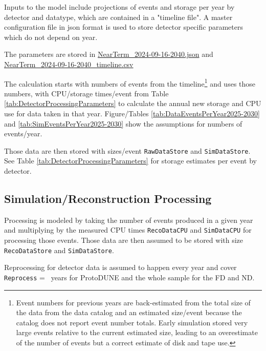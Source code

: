 \documentclass[12pt]{article}
\begin{document}
 Inputs to the model include projections of events and storage per year by detector and datatype, which are contained in a "timeline file".  A master configuration file in json format is used to store detector specific parameters which do not depend on year. 
 
 The parameters are stored in \href{https://github.com/DUNE/CCB-data/blob/CCB-Jun24/model-2024/NearTerm_2025-12-10-2040.json}{NearTerm\_2024-09-16-2040.json} and  \href{https://github.com/DUNE/CCB-data/blob/CCB-Jun24/model-2024/NearTerm_2025-12-10-2040_timeline.csv}{NearTerm\_2024-09-16-2040\_timeline.csv}
 
The calculation starts with numbers of events from the timeline\footnote{Event numbers for previous years are back-estimated from the total size of the data from the data catalog and an estimated size/event because the catalog does not report event number totals.  Early simulation stored very large events relative to the current estimated size, leading to an overestimate of the number of events but a correct estimate of disk and tape use.}  and uses those numbers, with CPU/storage times/event from Table \ref{tab:DetectorProcessingParameters} to calculate the annual new storage and CPU use for data taken in that year.  Figure/Tables \ref{tab:DataEventsPerYear2025-2030} and \ref{tab:SimEventsPerYear2025-2030} show the assumptions for numbers of events/year. 

{
}

{
}

Those data are then stored with sizes/event {\tt RawDataStore} and {\tt SimDataStore}.  See Table \ref{tab:DetectorProcessingParameters} for storage estimates per event by detector. 

\subsection{Simulation/Reconstruction Processing}

Processing is modeled by taking the number of events produced in a given year and multiplying by the measured CPU times {\tt RecoDataCPU} and {\tt SimDataCPU} for processing those events.  Those data are then assumed to be stored with size {\tt  RecoDataStore} and {\tt SimDataStore}.

Reprocessing for detector data is assumed to happen every year and cover {\tt Reprocess} = \configPDHDReprocess\ years for ProtoDUNE and the whole sample for the FD and ND.
\end{document}
